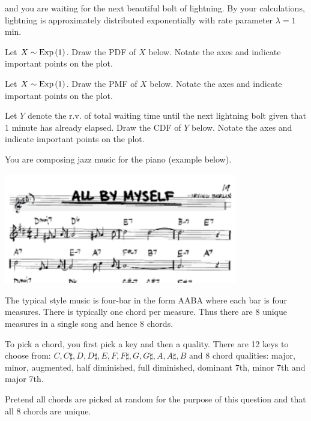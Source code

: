 \documentclass[12pt]{article}
\begin{document}
\noindent and you are waiting for the next beautiful bolt of lightning. By your calculations, lightning is approximately distributed exponentially with rate parameter $\lambda = 1$ min.


\benum
{} Let $X \sim \mathrm{Exp}\left(1\right)$. Draw the PDF of $X$ below. Notate the axes and indicate important points on the plot.  


 Let $X \sim \mathrm{Exp}\left(1\right)$. Draw the PMF of $X$ below. Notate the axes and indicate important points on the plot.  

 Let $Y$ denote the r.v. of total waiting time until the next lightning bolt given that 1 minute has already elapsed. Draw the CDF of $Y$ below. Notate the axes and indicate important points on the plot.  

\eenum


\problem You are composing jazz music for the piano (example below).

\begin{center}
\includegraphics[width=4in]{jazz.png}
\end{center}

\noindent The typical  style music is four-bar in the form AABA where each bar is four measures. There is typically one chord per measure. Thus there are 8 unique measures in a single song and hence 8 chords. 

To pick a chord, you first pick a key and then a quality. There are 12 keys to choose from: $C, C\sharp, D, D\sharp, E, F, F\sharp, G, G\sharp, A, A\sharp, B$ and 8 chord qualities: major, minor, augmented, half diminished, full diminished, dominant 7th, minor 7th and major 7th.

Pretend all chords are picked at random for the purpose of this question and that all 8 chords are unique.
\end{document}
